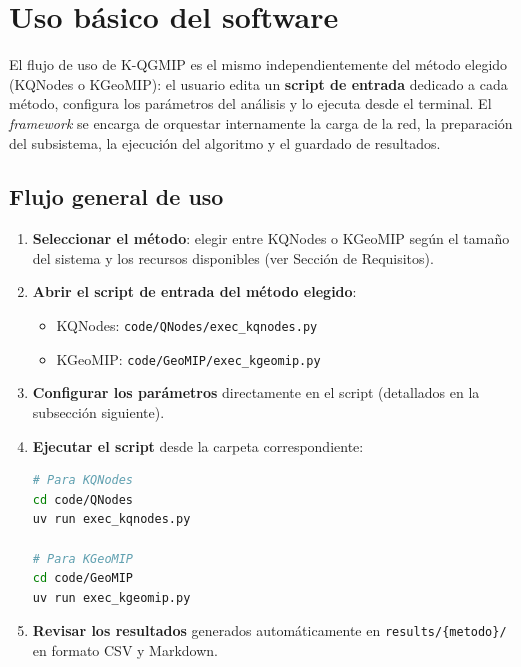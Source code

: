 
\section{Uso básico del software}

El flujo de uso de K-QGMIP es el mismo independientemente del método elegido
(KQNodes o KGeoMIP): el usuario edita un \textbf{script de entrada} dedicado a cada
método, configura los parámetros del análisis y lo ejecuta desde el terminal.
El \textit{framework} se encarga de orquestar internamente la carga de la red,
la preparación del subsistema, la ejecución del algoritmo y el guardado de resultados.

\subsection{Flujo general de uso}

\begin{enumerate}
  \item \textbf{Seleccionar el método}: elegir entre KQNodes o KGeoMIP según el
        tamaño del sistema y los recursos disponibles (ver Sección de Requisitos).

  \item \textbf{Abrir el script de entrada del método elegido}:
        \begin{itemize}
          \item KQNodes: \texttt{code/QNodes/exec\_kqnodes.py}
          \item KGeoMIP: \texttt{code/GeoMIP/exec\_kgeomip.py}
        \end{itemize}

  \item \textbf{Configurar los parámetros} directamente en el script
        (detallados en la subsección siguiente).

  \item \textbf{Ejecutar el script} desde la carpeta correspondiente:
\begin{lstlisting}[language=bash]
# Para KQNodes
cd code/QNodes
uv run exec_kqnodes.py

# Para KGeoMIP
cd code/GeoMIP
uv run exec_kgeomip.py
\end{lstlisting}

  \item \textbf{Revisar los resultados} generados automáticamente en
        \texttt{results/\{metodo\}/} en formato CSV y Markdown.
\end{enumerate}

